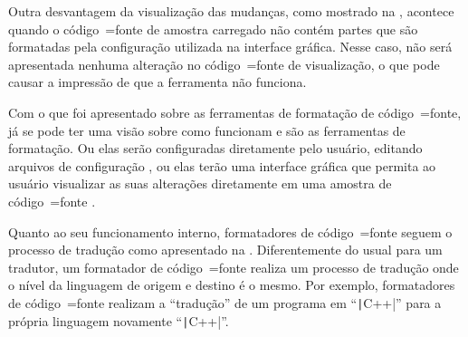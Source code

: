 Outra desvantagem da visualização das mudanças,
como mostrado na ,
acontece quando o código~=fonte de amostra carregado não contém partes que são formatadas pela configuração utilizada na interface gráfica.
Nesse caso,
não será apresentada nenhuma alteração no código~=fonte de visualização,
o que pode causar a impressão de que a ferramenta não funciona.

Com o que foi apresentado sobre as ferramentas de formatação de código~=fonte,
já se pode ter uma visão sobre como funcionam e
são as ferramentas de formatação.
Ou elas serão configuradas diretamente pelo usuário,
editando arquivos de configuração \cite{uncrustifySourceCode},
ou elas terão uma interface gráfica que permita ao usuário visualizar as suas alterações diretamente em uma amostra de código~=fonte \cite{universalIndentGUI}.

Quanto ao seu funcionamento interno,
formatadores de código~=fonte seguem o processo de tradução como apresentado na .
Diferentemente do usual para um tradutor,
um formatador de código~=fonte realiza um processo de tradução onde o nível da linguagem de origem e
destino é o mesmo.
Por exemplo,
formatadores de código~=fonte realizam a ``tradução'' de um programa em ``\texttt|C++|'' para a própria linguagem novamente ``\texttt|C++|''.


\section{}

